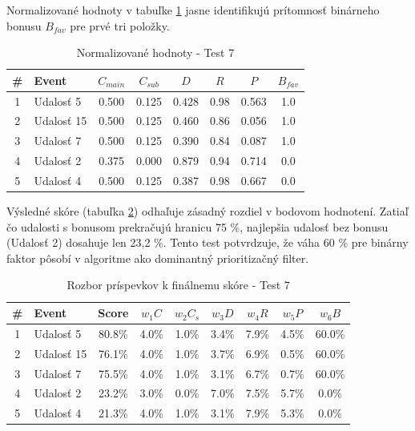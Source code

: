 Normalizované hodnoty v tabuľke \ref{tab:norm_test7} jasne identifikujú prítomnosť binárneho bonusu $B_{fav}$ pre prvé tri položky.

\begin{table}[H]
\centering
\small
\begin{tabular}{|c|l|c|c|c|c|c|c|}
\hline
\textbf{\#} & \textbf{Event} & $C_{main}$ & $C_{sub}$ & $D$ & $R$ & $P$ & $B_{fav}$ \\
\hline
1 & Udalosť 5  & 0.500 & 0.125 & 0.428 & 0.98 & 0.563 & 1.0 \\
2 & Udalosť 15 & 0.500 & 0.125 & 0.460 & 0.86 & 0.056 & 1.0 \\
3 & Udalosť 7  & 0.500 & 0.125 & 0.390 & 0.84 & 0.087 & 1.0 \\
4 & Udalosť 2  & 0.375 & 0.000 & 0.879 & 0.94 & 0.714 & 0.0 \\
5 & Udalosť 4  & 0.500 & 0.125 & 0.387 & 0.98 & 0.667 & 0.0 \\
\hline
\end{tabular}
\caption{Normalizované hodnoty - Test 7}
\label{tab:norm_test7}
\end{table}

Výsledné skóre (tabuľka \ref{tab:vysledky_test7}) odhaľuje zásadný rozdiel v bodovom hodnotení. Zatiaľ čo udalosti s bonusom prekračujú hranicu 75 \%, najlepšia udalosť bez bonusu (Udalosť 2) dosahuje len 23,2 \%. Tento test potvrdzuje, že váha 60 \% pre binárny faktor pôsobí v algoritme ako dominantný prioritizačný filter.

\begin{table}[H]
\centering
\small
\begin{tabular}{|c|l|c|c|c|c|c|c|c|}
\hline
\textbf{\#} & \textbf{Event} & \textbf{Score} & $w_1 C$ & $w_2 C_s$ & $w_3 D$ & $w_4 R$ & $w_5 P$ & $w_6 B$ \\
\hline
1 & Udalosť 5  & 80.8\% & 4.0\% & 1.0\% & 3.4\% & 7.9\% & 4.5\% & 60.0\% \\
2 & Udalosť 15 & 76.1\% & 4.0\% & 1.0\% & 3.7\% & 6.9\% & 0.5\% & 60.0\% \\
3 & Udalosť 7  & 75.5\% & 4.0\% & 1.0\% & 3.1\% & 6.7\% & 0.7\% & 60.0\% \\
4 & Udalosť 2  & 23.2\% & 3.0\% & 0.0\% & 7.0\% & 7.5\% & 5.7\% & 0.0\% \\
5 & Udalosť 4  & 21.3\% & 4.0\% & 1.0\% & 3.1\% & 7.9\% & 5.3\% & 0.0\% \\
\hline
\end{tabular}
\caption{Rozbor príspevkov k finálnemu skóre - Test 7}
\label{tab:vysledky_test7}
\end{table}

